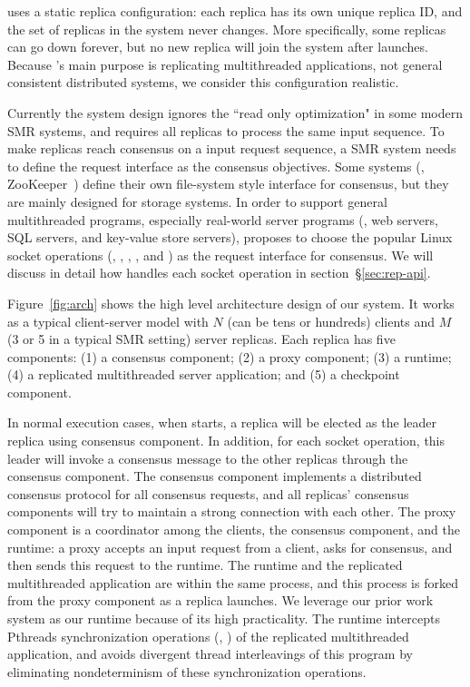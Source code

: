 \crane uses a static replica configuration: each replica has its own unique
replica ID, and the set of replicas in the \crane system never changes. More
specifically, some replicas can go down forever, but no new replica will join
the system after \crane launches. Because \crane's main purpose is replicating
multithreaded applications, not general consistent distributed systems, we
consider this configuration realistic.

Currently the \crane system design ignores the ``read only optimization" in some
modern SMR systems, and requires all replicas to process the same input
sequence. To make replicas reach consensus on a input request sequence, a SMR
system needs to define the request interface as the consensus objectives. Some
systems (\eg, ZooKeeper~\cite{zookeeper}) define their own file-system style
interface for consensus, but they are mainly designed for storage systems. In
order to support general multithreaded programs, especially real-world server
programs (\eg, web servers, SQL servers, and key-value store servers), \crane
proposes to choose the popular Linux socket operations (\eg, \connect, \accept,
\send, and \recv) as the request interface for consensus. We will discuss in
detail how \crane handles each socket operation in section~\S\ref{sec:rep-api}.

Figure~\ref{fig:arch} shows the high level architecture design of our \crane
system. It works as a typical client-server model with $N$ (can be tens or
hundreds) clients and $M$ (3 or 5 in a typical SMR setting) server replicas.
Each \crane replica has five components: (1) a consensus component; (2) a proxy
component; (3) a \smt runtime; (4) a replicated multithreaded server
application; and (5) a checkpoint component.

In normal execution cases, when \crane starts, a replica will be elected as the
leader replica using consensus component. In addition, for each socket
operation, this leader will invoke a consensus message to the other replicas
through the consensus component. The consensus component implements a \paxos
distributed consensus protocol for all consensus requests, and all replicas'
consensus components will try to maintain a strong connection with each other.
The proxy component is a coordinator among the clients, the consensus component,
and the \smt runtime: a proxy accepts an input request from a client, asks for
consensus, and then sends this request to the \smt runtime. The \smt runtime and
the replicated multithreaded application are within the same process, and this
process is forked from the proxy component as a replica launches. We leverage
our prior work \parrot system as our \smt runtime because of its high
practicality. The \parrot runtime intercepts Pthreads synchronization operations
(\eg, \mutexlock) of the replicated multithreaded application, and avoids
divergent thread interleavings of this program by eliminating nondeterminism of
these synchronization operations.

